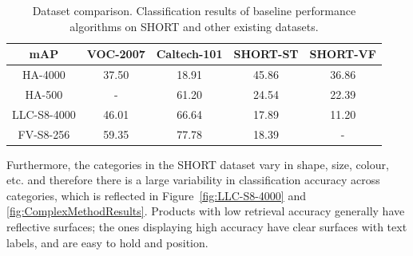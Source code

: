 \begin{table}
\begin{center}
    \begin{tabular}{ccccc}
    \toprule
    mAP & VOC-2007 & Caltech-101 & SHORT-ST & SHORT-VF \\
	\midrule
    HA-4000                    & 37.50    & 18.91       & 45.86       & 36.86 \\
    HA-500                     & -        & 61.20       & 24.54       & 22.39       \\
    LLC-S8-4000                & 46.01    & 66.64       & 17.89       & 11.20       \\
    FV-S8-256                  & 59.35    & 77.78       & 18.39       & -           \\
	\bottomrule
    \end{tabular}
	\end{center}
    \caption{Dataset comparison. Classification results of baseline performance algorithms on SHORT and other existing datasets.}
    \label{table:dataset_comparison}
\end{table}


Furthermore, the categories in the SHORT dataset vary in shape, size, colour, etc. and therefore there is a large variability in classification accuracy across categories, which is reflected in Figure~\ref{fig:LLC-S8-4000} and \ref{fig:ComplexMethodResults}. Products with low retrieval accuracy generally have reflective surfaces; the ones displaying high accuracy have clear surfaces with text labels, and are easy to hold and position. 



